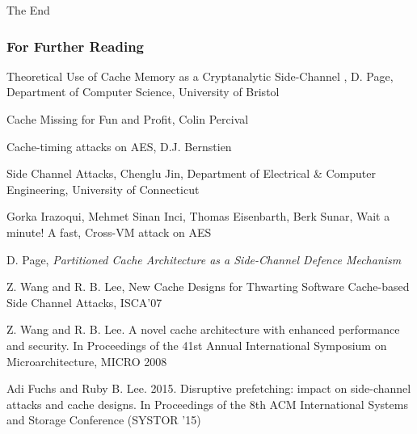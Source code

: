 \documentclass[10pt]{beamer}
\begin{document}
\begin{frame}
\Huge{\centerline{The End}}
\end{frame}

\begin{frame}[allowframebreaks]
    \frametitle<presentation>{For Further Reading}

    \begin{thebibliography}{10}
Theoretical Use of Cache Memory as a Cryptanalytic Side-Channel
, D. Page, Department of Computer Science, University of Bristol

            Cache Missing for Fun and Profit, Colin Percival

            Cache-timing attacks on AES, D.J. Bernstien

Side Channel Attacks, Chenglu Jin, Department of Electrical \& Computer Engineering, University of Connecticut

Gorka Irazoqui, Mehmet Sinan Inci, Thomas Eisenbarth, Berk Sunar, Wait a minute! A fast, Cross-VM attack on AES

D. Page, {\it Partitioned Cache Architecture as a Side-Channel Defence Mechanism}

Z. Wang and R. B. Lee, New Cache Designs for Thwarting Software Cache-based Side Channel Attacks, ISCA'07

Z. Wang and R. B. Lee. A novel cache architecture with enhanced performance and security. In Proceedings of the 41st Annual Inter­national Symposium on Microarchitecture, MICRO 2008

Adi Fuchs and Ruby B. Lee. 2015. Disruptive prefetching: impact on side-channel attacks and cache designs. In Proceedings of the 8th ACM International Systems and Storage Conference (SYSTOR '15)


\end{thebibliography}
\end{frame}
\end{document}
